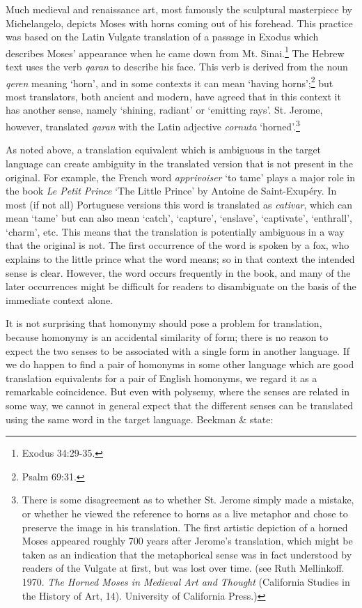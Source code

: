Much medieval and renaissance art, most famously the sculptural masterpiece by Michelangelo, depicts Moses with horns coming out of his forehead. This practice was based on the Latin Vulgate translation of a passage in Exodus which describes Moses’ appearance when he came down from Mt. Sinai.\footnote{Exodus 34:29-35.} The Hebrew text uses the verb \textit{qaran} to describe his face. This verb is derived from the noun \textit{qeren} meaning ‘horn’, and in some contexts it can mean ‘having horns’;\footnote{Psalm 69:31.} but most translators, both ancient and modern, have agreed that in this context it has another sense, namely ‘shining, radiant’ or ‘emitting rays’. St. Jerome, however, translated \textit{qaran} with the Latin adjective \textit{cornuta} ‘horned’.\footnote{There is some disagreement as to whether St. Jerome simply made a mistake, or whether he viewed the reference to horns as a live metaphor and chose to preserve the image in his translation. The first artistic depiction of a horned Moses appeared roughly 700 years after Jerome’s translation, which might be taken as an indication that the metaphorical sense was in fact understood by readers of the Vulgate at first, but was lost over time. (see Ruth Mellinkoff. 1970. \textit{The Horned Moses in Medieval Art and Thought} (California Studies in the History of Art, 14). University of California Press.)}



As noted above, a translation equivalent which is ambiguous in the target language can create ambiguity in the translated version that is not present in the original. For example, the French word \textit{apprivoiser} ‘to tame’ plays a major role in the book \textit{Le Petit Prince} ‘The Little Prince’ by Antoine de Saint-Exupéry. In most (if not all) Portuguese versions this word is translated as \textit{cativar}, which can mean ‘tame’ but can also mean ‘catch’, ‘capture’, ‘enslave’, ‘captivate’, ‘enthrall’, ‘charm’, etc. This means that the translation is potentially ambiguous in a way that the original is not. The first occurrence of the word is spoken by a fox, who explains to the little prince what the word means; so in that context the intended sense is clear. However, the word occurs frequently in the book, and many of the later occurrences might be difficult for readers to disambiguate on the basis of the immediate context alone.



It is not surprising that homonymy should pose a problem for translation, because homonymy is an accidental similarity of form; there is no reason to expect the two senses to be associated with a single form in another language. If we do happen to find a pair of homonyms in some other language which are good translation equivalents for a pair of English homonyms, we regard it as a remarkable coincidence. But even with polysemy, where the senses are related in some way, we cannot in general expect that the different senses can be translated using the same word in the target language. Beekman \& \citet[103]{Callow1974} state:


